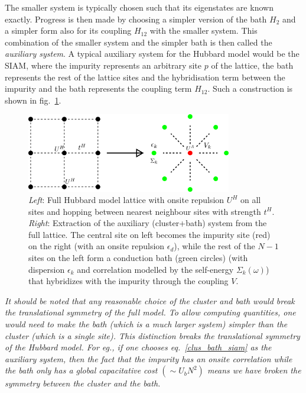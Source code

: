 \documentclass{article}
\numberwithin{equation}{section}
\begin{document}
The smaller system is typically chosen such that its eigenstates are known exactly.
Progress is then made by choosing a simpler version of the bath \(H_2\) and a simpler form also for its coupling \(H_{12}\) with the smaller system.
This combination of the smaller system and the simpler bath is then called the \textit{auxiliary system}.
A typical auxiliary system for the Hubbard model would be the SIAM, where the impurity represents an arbitrary site \(p\) of the lattice, the bath represents the rest of the lattice sites and the hybridisation term between the impurity and the bath represents the coupling term \(H_{12}\).
Such a construction is shown in fig.~\ref{cluster-bath}.
\begin{figure}[htpb!]
	\centering
	\includegraphics[width=0.8\textwidth]{cluster-bath.png}
	\caption{\textit{Left}: Full Hubbard model lattice with onsite repulsion $U^H$ on all sites and hopping between nearest neighbour sites with strength $t^H$. \textit{Right}: Extraction of the auxiliary (cluster+bath) system from the full lattice. The central site on left becomes the impurity site (red) on the right (with an onsite repulsion $\epsilon_d$), while the rest of the $N-1$ sites on the left form a conduction bath (green circles) (with dispersion $\epsilon_k$ and correlation modelled by the self-energy $\Sigma_k(\omega)$) that hybridizes with the impurity through the coupling $V$.}
	\label{cluster-bath}
\end{figure}
\textit{It should be noted that any reasonable choice of the cluster and bath would break the translational symmetry of the full model. To allow computing quantities, one would need to make the bath (which is a much larger system) simpler than the cluster (which is a single site). This distinction breaks the translational symmetry of the Hubbard model. For eg., if one chooses eq.~\ref{clus_bath_siam} as the auxiliary system, then the fact that the impurity has an onsite correlation while the bath only has a global capacitative cost $(\sim U_b N^2)$ means we have broken the symmetry between the cluster and the bath.}
\end{document}
